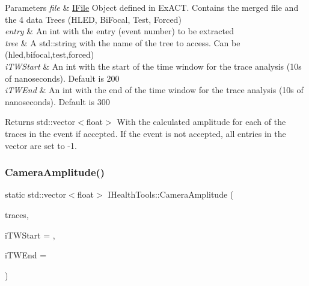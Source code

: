 \begin{DoxyItemize}
\item 
\begin{DoxyParams}{Parameters}
{\em file} & \hyperlink{classIFile}{I\+File} Object defined in Ex\+A\+CT. Contains the merged file and the 4 data Trees (H\+L\+ED, Bi\+Focal, Test, Forced) \\
\hline
{\em entry} & An int with the entry (event number) to be extracted \\
\hline
{\em tree} & A std\+::string with the name of the tree to access. Can be (hled,bifocal,test,forced) \\
\hline
{\em i\+T\+W\+Start} & An int with the start of the time window for the trace analysis (10s of nanoseconds). Default is 200 \\
\hline
{\em i\+T\+W\+End} & An int with the end of the time window for the trace analysis (10s of nanoseconds). Default is 300\\
\hline
\end{DoxyParams}
\begin{DoxyReturn}{Returns}
std\+::vector$<$float$>$ With the calculated amplitude for each of the traces in the event if accepted. If the event is not accepted, all entries in the vector are set to -\/1. 
\end{DoxyReturn}

\end{DoxyItemize}\mbox{\label{classIHealthTools_a37c86d665727324db9248a0027a8b871}} 
\subsubsection{\texorpdfstring{Camera\+Amplitude()}{CameraAmplitude()}\hspace{0.1cm}{\footnotesize\ttfamily [3/3]}}
{\footnotesize\ttfamily static std\+::vector$<$float$>$ I\+Health\+Tools\+::\+Camera\+Amplitude (\begin{DoxyParamCaption}\item[{std\+::vector$<$ std\+::vector$<$ int $>$$>$}]{traces,  }\item[{int}]{i\+T\+W\+Start = {},  }\item[{int}]{i\+T\+W\+End = {} }\end{DoxyParamCaption})\hspace{0.3cm}{\ttfamily [static]}}



